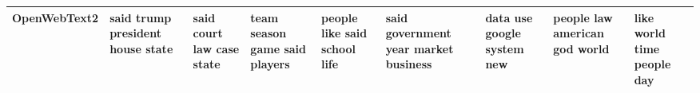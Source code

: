 \documentclass[11pt,a4paper]{article}
\begin{document}
\begin{appendices}
\begin{table*}[htp]
\begin{tiny}
\begin{tabular}{|p{}|p{}|p{}|p{}|p{}|p{}|p{}|p{}|p{}|}
OpenWebText2 & said \newline trump \newline president \newline house \newline state & said \newline court \newline law \newline case \newline state & team \newline season \newline game \newline said \newline players & people \newline like \newline said \newline school \newline life & said \newline government \newline year \newline market \newline business & data \newline use \newline google \newline system \newline new & people \newline law \newline american \newline god \newline world & like \newline world \newline time \newline people \newline day\\\hline

\end{tabular}
\end{tiny}
\end{table*}
\end{appendices}
\end{document}
